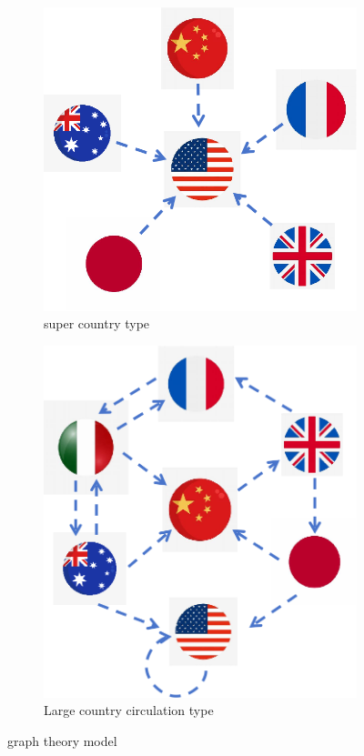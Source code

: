 \documentclass{mcmthesis}
\begin{document}
\begin{figure}[H]
    \centering
    \begin{subfigure}{0.45\textwidth}
        \centering
        \includegraphics[width=\textwidth]{graph/graphy super country.png}
        \caption{super country type}
        \label{subfig:player1}
    \end{subfigure}
    \hfill
    \begin{subfigure}{0.45\textwidth}
        \centering
        \includegraphics[width=\textwidth]{graph/graphy country flow.png}
        \caption{Large country circulation type}
        \label{subfig:player2}
    \end{subfigure}
    \caption{graph theory model}
    \label{Figure 13}
\end{figure}
\end{document}
